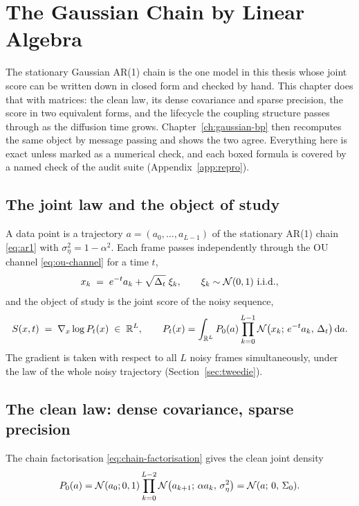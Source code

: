 \chapter{The Gaussian Chain by Linear Algebra}\label{ch:gaussian}

The stationary Gaussian AR(1) chain is the one model in this thesis whose joint
score can be written down in closed form and checked by hand. This chapter does
that with matrices: the clean law, its dense covariance and sparse precision,
the score in two equivalent forms, and the lifecycle the coupling structure
passes through as the diffusion time grows. Chapter~\ref{ch:gaussian-bp} then
recomputes the same object by message passing and shows the two agree.
Everything here is exact unless marked as a numerical check, and each boxed
formula is covered by a named check of the audit suite
(Appendix~\ref{app:repro}).
\section{The joint law and the object of study}\label{sec:g-model}

A data point is a trajectory $a = (a_0, \dots, a_{L-1})$ of the stationary
AR(1) chain \eqref{eq:ar1} with $\sigma_\eta^2 = 1 - \alpha^2$. Each frame
passes independently through the OU channel \eqref{eq:ou-channel} for a
time $t$,
\begin{equation}
  x_k \;=\; e^{-t} a_k + \sqrt{\Delta_t}\;\xi_k,
  \qquad \xi_k \sim \mathcal{N}(0,1)\ \text{i.i.d.},
  \label{eq:g-channel}
\end{equation}
and the object of study is the joint score of the noisy sequence,
\begin{equation}
  S(x, t) \;=\; \nabla_x \log P_t(x) \;\in\; \mathbb{R}^L,
  \qquad
  P_t(x) = \int_{\mathbb{R}^L} P_0(a) \prod_{k=0}^{L-1}
    \mathcal{N}\big(x_k;\, e^{-t}a_k,\, \Delta_t\big)\, \mathrm{d} a .
  \label{eq:g-object}
\end{equation}
The gradient is taken with respect to all $L$ noisy frames simultaneously,
under the law of the whole noisy trajectory
(Section~\ref{sec:tweedie}).

\section{The clean law: dense covariance, sparse precision}
\label{sec:g-clean}

The chain factorisation \eqref{eq:chain-factorisation} gives the clean
joint density
\begin{equation}
  P_0(a)
  = \mathcal{N}(a_0; 0, 1) \prod_{k=0}^{L-2}
    \mathcal{N}\big(a_{k+1};\, \alpha a_k,\, \sigma_\eta^2\big)
  = \mathcal{N}(a;\, 0,\, \Sigma_0).
  \label{eq:g-P0}
\end{equation}

